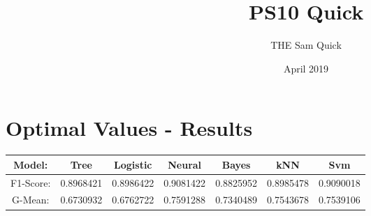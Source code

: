 \documentclass{article}
\title{PS10 Quick}
\author{THE Sam Quick}
\date{April 2019}
\begin{document}
\maketitle
\section{Optimal Values - Results}
\begin{center}
 \begin{tabular}{||c c c c c c c||} 
 \hline
  Model: & Tree & Logistic & Neural & Bayes & kNN & Svm \\ [0.5ex] 
 \hline\hline
 F1-Score: & 0.8968421 & 0.8986422 & 0.9081422 & 0.8825952 & 0.8985478 & 0.9090018 \\ 
 \hline
 G-Mean: & 0.6730932 &  0.6762722 & 0.7591288 & 0.7340489 & 0.7543678 & 0.7539106  \\ 
 \hline
\end{tabular}
\end{center}
\end{document}
